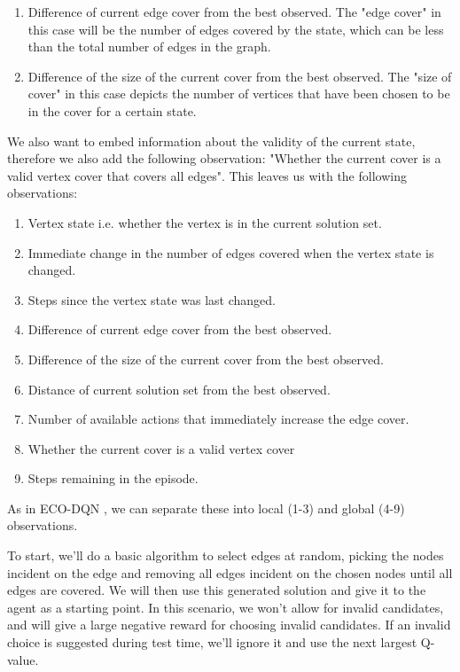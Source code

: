 \documentclass{article}
\begin{document}
\begin{enumerate}
    \item Difference of current edge cover from the best observed. The "edge cover" in this case will be the number of edges covered by the state, which can be less than the total number of edges in the graph.
    \item Difference of the size of the current cover from the best observed. The "size of cover" in this case depicts the number of vertices that have been chosen to be in the cover for a certain state. 
\end{enumerate}

We also want to embed information about the validity of the current state, therefore we also add the following observation: "Whether the current cover is a valid vertex cover that covers all edges". This leaves us with the following observations:

\begin{enumerate}
    \item Vertex state i.e. whether the vertex is in the current solution set.
    \item Immediate change in the number of edges covered when the vertex state is changed.
    \item Steps since the vertex state was last changed.
    \item Difference of current edge cover from the best observed.
    \item Difference of the size of the current cover from the best observed.
    \item Distance of current solution set from the best observed. 
    \item Number of available actions that immediately increase the edge cover. 
    \item Whether the current cover is a valid vertex cover
    \item Steps remaining in the episode.
\end{enumerate}

As in ECO-DQN \cite{eco-dqn}, we can separate these into local (1-3) and global (4-9) observations.

To start, we'll do a basic algorithm to select edges at random, picking the nodes incident on the edge and removing all edges incident on the chosen nodes until all edges are covered. We will then use this generated solution and give it to the agent as a starting point. In this scenario, we won't allow for invalid candidates, and will give a large negative reward for choosing invalid candidates. If an invalid choice is suggested during test time, we'll ignore it and use the next largest Q-value. 
\end{document}
